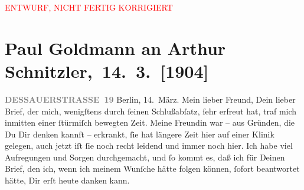
\begin{center}
            \textcolor{red}{ENTWURF, NICHT FERTIG KORRIGIERT}
                      \end{center}
            
         
         \renewcommand{\erwaehntePersonen}{Personen: Paul Goldmann, Theodore Rottenberg, Olga Schnitzler, Heinrich Schnitzler}
         \renewcommand{\erwaehnteOrte}{Orte: Berlin, Dessauer Straße, Deutsches Theater Berlin, Italien, Neapel, Palermo, Pompei, Rom, Sizilien, Taormina, Wien}
         \renewcommand{\erwaehnteWerke}{Werke: Berliner Theater. »Der einsame Weg«. Von Arthur Schnitzler, Der einsame Weg. Schauspiel in fünf Akten, Neue Freie Presse}
               \section[ Paul Goldmann an Arthur Schnitzler, 14. 3. {[}1904{]}]{ Paul Goldmann an Arthur Schnitzler, 14. 3. {[}1904{]}}\nopagebreak{}\rehead{ }\begin{ledgroupsized}[t]{13cm}\normalsize\beginnumbering \toendnotes[C]{\smallbreak\pagebreak[2]} 
\toendnotes[C]{\smallbreak}\pstart
           \noindent{}\raggedleft{}{\pb}\textcolor{gray}{\textbf{DESSAUERSTRASSE 19}}\pend
           \pstart
           Berlin, 14. März.\pend
           \pstart{}Mein lieber Freund,\pend\pstart
           Dein lieber Brief, der mich, wenigſtens durch ſeinen Schlußabſatz, ſehr erfreut hat,
               traf mich inmitten einer ſtürmiſch  bewegten Zeit.
               Meine Freundin war – aus
               Gründen, die Du Dir denken kannſt – erkrankt,  ſie
               hat längere Zeit hier auf einer Klinik gelegen, auch jetzt iſt ſie noch recht leidend
               und immer noch hier. Ich habe viel Aufregungen und Sorgen durchgemacht, und ſo kommt
               es, daß ich \introOben{}für\introOben{} Deinen Brief, den ich, wenn ich meinem
               Wunſche hätte \strikeout{\textcolor{gray}{erf}} folgen können, ſofort beantwortet hätte, Dir erſt heute danken kann.\pend

\end{ledgroupsized}
